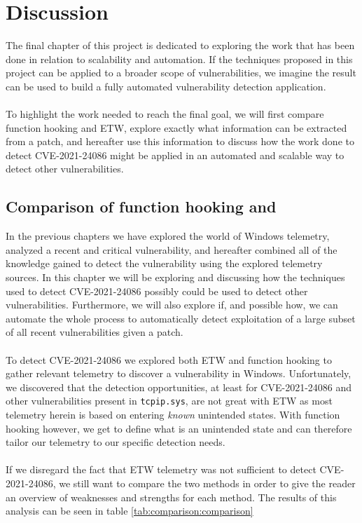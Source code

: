 \documentclass{report}
\begin{document}
\chapter{Discussion}
\label{cha:scaling-and-automation}
The final chapter of this project is dedicated to exploring the work that has been done in relation to scalability and automation. If the techniques proposed in this project can be applied to a broader scope of vulnerabilities, we imagine the result can be used to build a fully automated vulnerability detection application.
\\
\\
To highlight the work needed to reach the final goal, we will first compare function hooking and \gls{ETW}, explore exactly what information can be extracted from a patch, and hereafter use this information to discuss how the work done to detect CVE-2021-24086 might be applied in an automated and scalable way to detect other vulnerabilities.

\section{Comparison of function hooking and }
In the previous chapters we have explored the world of Windows telemetry, analyzed a recent and critical vulnerability, and hereafter combined all of the knowledge gained to detect the vulnerability using the explored telemetry sources. In this chapter we will be exploring and discussing how the techniques used to detect CVE-2021-24086 possibly could be used to detect other vulnerabilities. Furthermore, we will also explore if, and possible how, we can automate the whole process to automatically detect exploitation of a large subset of all recent vulnerabilities given a patch.
\\
\\
To detect CVE-2021-24086 we explored both \gls{ETW} and function hooking to gather relevant telemetry to discover a vulnerability in Windows. Unfortunately, we discovered that the detection opportunities, at least for CVE-2021-24086 and other vulnerabilities present in \texttt{tcpip.sys}, are not great with \gls{ETW} as most telemetry herein is based on entering \emph{known} unintended states. With function hooking however, we get to define what is an unintended state and can therefore tailor our telemetry to our specific detection needs.
\\
\\
If we disregard the fact that \gls{ETW} telemetry was not sufficient to detect CVE-2021-24086, we still want to compare the two methods in order to give the reader an overview of weaknesses and strengths for each method. The results of this analysis can be seen in table \ref{tab:comparison:comparison}
\end{document}
